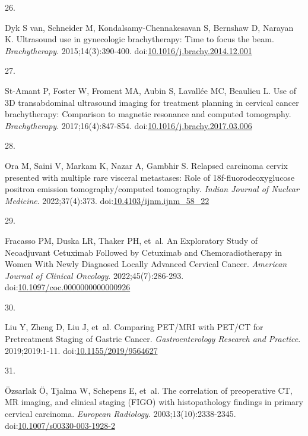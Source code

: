 \documentclass[
  a4paper,
]{scrreprt}
\newlength{\cslhangindent}
\newlength{\csllabelwidth}
\newlength{\cslentryspacingunit} %
\newenvironment{CSLReferences}[2] %
 {%
  \setlength{\parindent}{0pt}
  \ifodd #1
  \let\oldpar\par
  \def\par{\hangindent=\cslhangindent\oldpar}
  \fi
  \setlength{\parskip}{#2\cslentryspacingunit}
 }%
 {}
\newcommand{\CSLLeftMargin}[1]{\parbox[t]{\csllabelwidth}{#1}}
\newcommand{\CSLRightInline}[1]{\parbox[t]{\linewidth - \csllabelwidth}{#1}\break}
\begin{document}
\begin{CSLReferences}{0}{0}
\leavevmode{}%
\CSLLeftMargin{26. }%
\CSLRightInline{Dyk S van, Schneider M, Kondalsamy-Chennakesavan S,
Bernshaw D, Narayan K. Ultrasound use in gynecologic brachytherapy: Time
to focus the beam. \emph{Brachytherapy}. 2015;14(3):390-400.
doi:\href{https://doi.org/10.1016/j.brachy.2014.12.001}{10.1016/j.brachy.2014.12.001}}

\leavevmode{}%
\CSLLeftMargin{27. }%
\CSLRightInline{St-Amant P, Foster W, Froment MA, Aubin S, Lavallée MC,
Beaulieu L. Use of 3D transabdominal ultrasound imaging for treatment
planning in cervical cancer brachytherapy: Comparison to magnetic
resonance and computed tomography. \emph{Brachytherapy}.
2017;16(4):847-854.
doi:\href{https://doi.org/10.1016/j.brachy.2017.03.006}{10.1016/j.brachy.2017.03.006}}

\leavevmode{}%
\CSLLeftMargin{28. }%
\CSLRightInline{Ora M, Saini V, Markam K, Nazar A, Gambhir S. Relapsed
carcinoma cervix presented with multiple rare visceral metastases: Role
of 18f-fluorodeoxyglucose positron emission tomography/computed
tomography. \emph{Indian Journal of Nuclear Medicine}. 2022;37(4):373.
doi:\href{https://doi.org/10.4103/ijnm.ijnm_58_22}{10.4103/ijnm.ijnm\_58\_22}}

\leavevmode{}%
\CSLLeftMargin{29. }%
\CSLRightInline{Fracasso PM, Duska LR, Thaker PH, et~al. An Exploratory
Study of Neoadjuvant Cetuximab Followed by Cetuximab and
Chemoradiotherapy in Women With Newly Diagnosed Locally Advanced
Cervical Cancer. \emph{American Journal of Clinical Oncology}.
2022;45(7):286-293.
doi:\href{https://doi.org/10.1097/coc.0000000000000926}{10.1097/coc.0000000000000926}}

\leavevmode{}%
\CSLLeftMargin{30. }%
\CSLRightInline{Liu Y, Zheng D, Liu J, et~al. Comparing PET/MRI with
PET/CT for Pretreatment Staging of Gastric Cancer.
\emph{Gastroenterology Research and Practice}. 2019;2019:1-11.
doi:\href{https://doi.org/10.1155/2019/9564627}{10.1155/2019/9564627}}

\leavevmode{}%
\CSLLeftMargin{31. }%
\CSLRightInline{Özsarlak Ö, Tjalma W, Schepens E, et~al. The correlation
of preoperative CT, MR imaging, and clinical staging (FIGO) with
histopathology findings in primary cervical carcinoma. \emph{European
Radiology}. 2003;13(10):2338-2345.
doi:\href{https://doi.org/10.1007/s00330-003-1928-2}{10.1007/s00330-003-1928-2}}


\end{CSLReferences}
\end{document}
